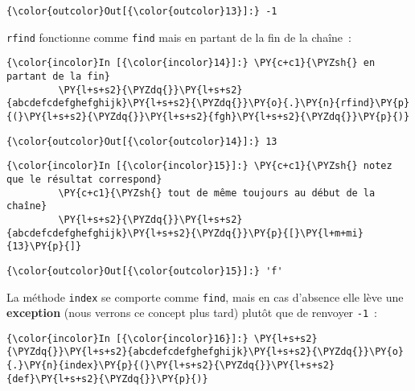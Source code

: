 \begin{Verbatim}[commandchars=\\\{\}]
{\color{outcolor}Out[{\color{outcolor}13}]:} -1
\end{Verbatim}
            
    \texttt{rfind} fonctionne comme \texttt{find} mais en partant de la fin
de la chaîne~:

    \begin{Verbatim}[commandchars=\\\{\}]
{\color{incolor}In [{\color{incolor}14}]:} \PY{c+c1}{\PYZsh{} en partant de la fin}
         \PY{l+s+s2}{\PYZdq{}}\PY{l+s+s2}{abcdefcdefghefghijk}\PY{l+s+s2}{\PYZdq{}}\PY{o}{.}\PY{n}{rfind}\PY{p}{(}\PY{l+s+s2}{\PYZdq{}}\PY{l+s+s2}{fgh}\PY{l+s+s2}{\PYZdq{}}\PY{p}{)}
\end{Verbatim}


\begin{Verbatim}[commandchars=\\\{\}]
{\color{outcolor}Out[{\color{outcolor}14}]:} 13
\end{Verbatim}
            
    \begin{Verbatim}[commandchars=\\\{\}]
{\color{incolor}In [{\color{incolor}15}]:} \PY{c+c1}{\PYZsh{} notez que le résultat correspond}
         \PY{c+c1}{\PYZsh{} tout de même toujours au début de la chaîne}
         \PY{l+s+s2}{\PYZdq{}}\PY{l+s+s2}{abcdefcdefghefghijk}\PY{l+s+s2}{\PYZdq{}}\PY{p}{[}\PY{l+m+mi}{13}\PY{p}{]}
\end{Verbatim}


\begin{Verbatim}[commandchars=\\\{\}]
{\color{outcolor}Out[{\color{outcolor}15}]:} 'f'
\end{Verbatim}
            
    La méthode \texttt{index} se comporte comme \texttt{find}, mais en cas
d'absence elle lève une \textbf{exception} (nous verrons ce concept plus
tard) plutôt que de renvoyer \texttt{-1}~:

    \begin{Verbatim}[commandchars=\\\{\}]
{\color{incolor}In [{\color{incolor}16}]:} \PY{l+s+s2}{\PYZdq{}}\PY{l+s+s2}{abcdefcdefghefghijk}\PY{l+s+s2}{\PYZdq{}}\PY{o}{.}\PY{n}{index}\PY{p}{(}\PY{l+s+s2}{\PYZdq{}}\PY{l+s+s2}{def}\PY{l+s+s2}{\PYZdq{}}\PY{p}{)}
\end{Verbatim}


